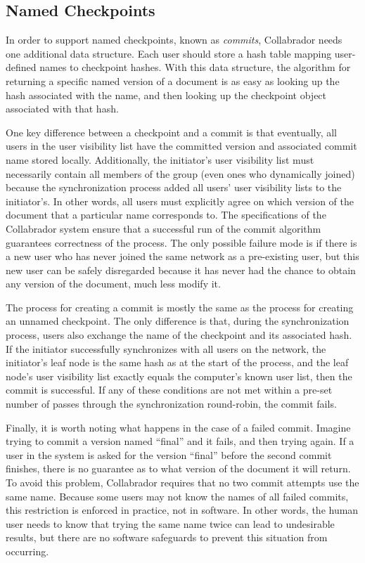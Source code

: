 \documentclass[11pt,titlepage]{article}
\begin{document}
\subsection{Named Checkpoints}

In order to support named checkpoints, known as \emph{commits},
Collabrador needs one additional data structure. Each user should
store a hash table mapping user-defined names to checkpoint hashes. 
With this data structure, the algorithm for returning a specific named
version of a document is as easy as looking up the hash associated with the name,
and then looking up the checkpoint object associated with that hash.

One key difference between a checkpoint and a commit is that eventually, 
all users in the user visibility list have the
committed version and associated commit name stored
locally. Additionally, the initiator's user visibility list must
necessarily contain all members of the group (even ones who
dynamically joined) because the synchronization process added all
users' user visibility lists to the initiator's. In other words,
all users must explicitly agree on which version of the document that
a particular name corresponds to. 
The specifications of the Collabrador system ensure that a successful
run of the commit algorithm guarantees correctness of the
process. The only possible failure mode is if there is a new user
 who has never joined the same network as a pre-existing user, 
but this new user can be safely disregarded because it has never 
had the chance to obtain any version of the document, much less modify it.

The process for creating a commit is mostly the same as the process
for creating an unnamed checkpoint. The only difference is that,
during the synchronization process, users also exchange the name of
the checkpoint and its associated hash. If the initiator successfully
synchronizes with all users on the network, the initiator's leaf node
is the same hash as at the start of the process, and the leaf node's
user visibility list exactly equals the computer's known user list,
then the commit is successful. If any of these conditions are not met
within a pre-set number of passes through the synchronization
round-robin, the commit fails.

Finally, it is worth noting what happens in the case of a failed
commit. Imagine trying to commit a version named ``final'' and it
fails, and then trying again. If a user in the system is asked for the
version ``final'' before the second commit finishes, there is no
guarantee as to what version of the document it will return. To avoid
this problem, Collabrador requires that no two commit attempts use the
same name. Because some users may not know the names of all failed
commits, this restriction is enforced in practice, not in software. In
other words, the human user needs to know that trying the same name
twice can lead to undesirable results, but there are no software
safeguards to prevent this situation from occurring. 
\end{document}
